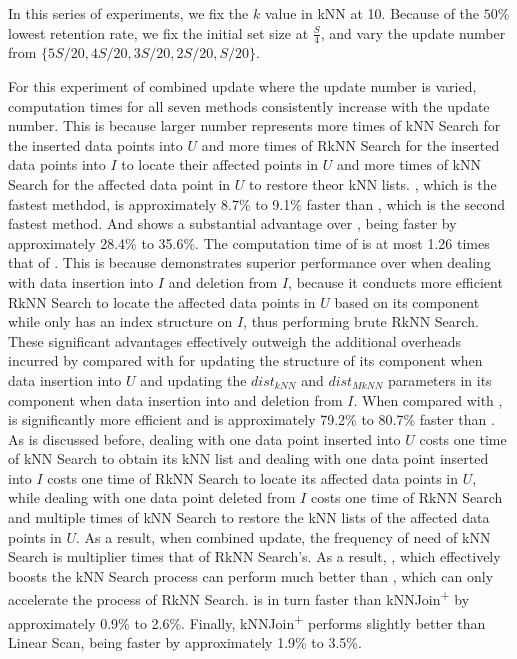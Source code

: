  In this series of experiments, we fix the $k$ value in kNN at 10. Because of the $50\%$ lowest retention rate, we fix the initial set size at $\frac{S}{4}$, and vary the update number from $\{5S/20,4S/20,3S/20,2S/20,S/20\}$.

For this experiment of combined update where the update number is varied, computation times for all seven methods consistently increase with the update number. This is because larger number represents more times of kNN Search for the inserted data points into $U$ and more times of RkNN Search for the inserted data points into $I$ to locate their affected points in $U$ and more times of kNN Search for the affected data point in $U$ to restore theor kNN lists. \cpdualtree, which is the fastest methdod, is approximately 8.7\% to 9.1\% faster than \spdualtree, which is the second fastest method.
And \spdualtree shows a substantial advantage over \dualtree, being faster by approximately 28.4\% to 35.6\%. The computation time of \deltatree is at most 1.26 times that of \dualtree. This is because \dualtree demonstrates superior performance over \deltatree when dealing with data insertion into $I$ and deletion from $I$, because it conducts more efficient RkNN Search to locate the affected data points in $U$ based on its \hdrtree component while \deltatree only has an index structure on $I$, thus performing brute RkNN Search. These significant advantages effectively outweigh the additional overheads incurred by \dualtree compared with \deltatree for updating the structure of its \hdrtree component when data insertion into $U$ and updating the $dist_{kNN}$ and $dist_{MkNN}$ parameters in its \hdrtree component when data insertion into and deletion from $I$. When compared with \hdrtree, \deltatree is significantly more efficient and is approximately 79.2\% to 80.7\% faster than \hdrtree. As is discussed before, dealing with one data point inserted into $U$ costs one time of kNN Search to obtain its kNN list and dealing with one data point inserted into $I$ costs one time of RkNN Search to locate its affected data points in $U$, while dealing with one data point deleted from $I$ costs one time of RkNN Search and multiple times of kNN Search to restore the kNN lists of the affected data points in $U$. As a result, when combined update, the frequency of need of kNN Search is multiplier times that of RkNN Search's. As a result, \deltatree, which effectively boosts the kNN Search process can perform much better than \hdrtree, which can only accelerate the process of RkNN Search. \hdrtree is in turn faster than kNNJoin\textsuperscript{+} by approximately 0.9\% to 2.6\%. Finally, kNNJoin\textsuperscript{+} performs slightly better than Linear Scan, being faster by approximately 1.9\% to 3.5\%.

